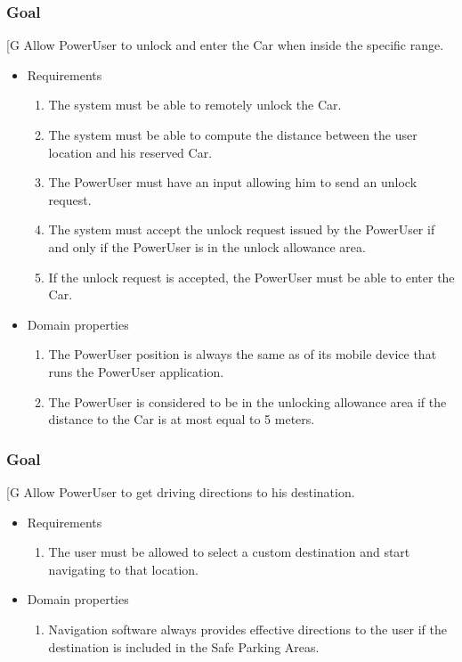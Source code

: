     \subsubsection{Goal }
    {[}G\arabic{goalctr}{]}
	Allow PowerUser to unlock and enter the Car when inside the specific range.
    \begin{itemize}
        \item Requirements
        \begin{enumerate}[REQ]
    	        \item The system must be able to remotely unlock the Car.
			    \item The system must be able to compute the distance between the user location and his reserved Car.
			    \item The PowerUser must have an input allowing him to send an unlock request.
			    \item The system must accept the unlock request issued by the PowerUser if and only if the PowerUser is in the unlock allowance area.
			    \item If the unlock request is accepted, the PowerUser must be able to enter the Car.
        \end{enumerate}
        \item Domain properties
        \begin{enumerate}[PRO]
                \item The PowerUser position is always the same as of its mobile device that runs the PowerUser application.
    			\item The PowerUser is considered to be in the unlocking allowance area if the distance to the Car is at most equal to 5 meters.
        \end{enumerate}
    \end{itemize}
    
    \subsubsection{Goal }
    {[}G\arabic{goalctr}{]}
    Allow PowerUser to get driving directions to his destination.
    \begin{itemize}
        \item Requirements
        \begin{enumerate}[REQ]
    			\item The user must be allowed to select a custom destination and start navigating to that location.
        \end{enumerate}
        \item Domain properties
        \begin{enumerate}[PRO]
    			\item Navigation software always provides effective directions to the user if the destination is included in the Safe Parking Areas.
        \end{enumerate}
    \end{itemize}
    
